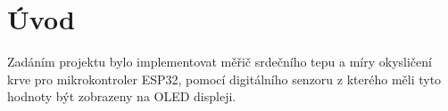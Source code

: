 \section{Úvod}
Zadáním projektu bylo implementovat měřič srdečního tepu a míry okysličení krve pro mikrokontroler ESP32, pomocí digitálního senzoru z kterého měli tyto hodnoty být zobrazeny na OLED displeji.

